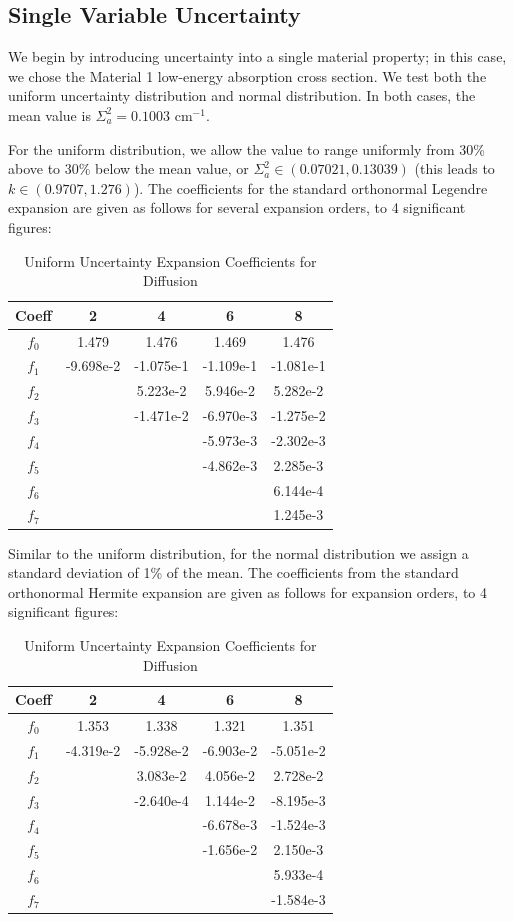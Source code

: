 \subsection{Single Variable Uncertainty}
We begin by introducing uncertainty into a single material property; in this case, we chose the Material 1 low-energy absorption cross section.  We test both the uniform uncertainty distribution and normal distribution.   In both cases, the mean value is $\Sigma_a^2=0.1003 \text{ cm}^{-1}$.

For the uniform distribution, we allow the value to range uniformly from 30\% above to 30\% below the mean value, or $\Sigma_a^2\in(0.07021,0.13039)$ (this leads to $k\in(0.9707,1.276)$).  The coefficients for the standard orthonormal Legendre expansion are given as follows for several expansion orders, to 4 significant figures:
\begin{table}[h!]
\centering
\begin{tabular}{c || c c c c}
Coeff & 2 & 4 & 6 & 8\\ \hline
$f_0$ & 1.479 & 1.476 & 1.469 & 1.476 \\
$f_1$ & -9.698e-2 & -1.075e-1 & -1.109e-1 & -1.081e-1 \\
$f_2$ &  & 5.223e-2 & 5.946e-2 &  5.282e-2\\
$f_3$ &  & -1.471e-2 & -6.970e-3 &  -1.275e-2\\
$f_4$ &  &  & -5.973e-3 &  -2.302e-3\\
$f_5$ &  &  & -4.862e-3 &  2.285e-3\\
$f_6$ &  &  &  &  6.144e-4\\
$f_7$ &  &  &  &  1.245e-3
\end{tabular}
\caption{Uniform Uncertainty Expansion Coefficients for Diffusion}
\end{table}

Similar to the uniform distribution, for the normal distribution we assign a standard deviation of 1\% of the mean.  The coefficients from the standard orthonormal Hermite expansion are given as follows for expansion orders, to 4 significant figures:
\begin{table}[h!]
\centering
\begin{tabular}{c || c c c c}
Coeff & 2 & 4 & 6 & 8\\ \hline
$f_0$ & 1.353 & 1.338 & 1.321 & 1.351 \\
$f_1$ & -4.319e-2 & -5.928e-2 & -6.903e-2 & -5.051e-2 \\
$f_2$ &  & 3.083e-2 & 4.056e-2 & 2.728e-2 \\
$f_3$ &  & -2.640e-4 & 1.144e-2 & -8.195e-3 \\
$f_4$ &  &  & -6.678e-3 & -1.524e-3 \\
$f_5$ &  &  & -1.656e-2 & 2.150e-3 \\
$f_6$ &  &  &  & 5.933e-4 \\
$f_7$ &  &  &  & -1.584e-3 
\end{tabular}
\caption{Uniform Uncertainty Expansion Coefficients for Diffusion}
\end{table}

